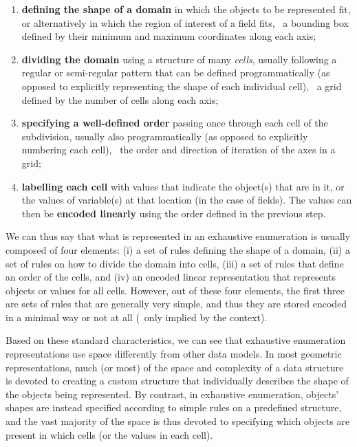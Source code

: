 \begin{enumerate}

\item \textbf{defining the shape of a domain} in which the objects to be represented fit, or alternatively in which the region of interest of a field fits, \eg\ a bounding box defined by their minimum and maximum coordinates along each axis;

\item \textbf{dividing the domain} using a structure of many \emph{cells}, usually following a regular or semi-regular pattern that can be defined programmatically (as opposed to explicitly representing the shape of each individual cell), \eg\ a grid defined by the number of cells along each axis;

\item \textbf{specifying a well-defined order} passing once through each cell of the subdivision, usually also programmatically (as opposed to explicitly numbering each cell), \eg\ the order and direction of iteration of the axes in a grid;

\item \textbf{labelling each cell} with values that indicate the object(s) that are in it, or the values of variable(s) at that location (in the case of fields). The values can then be \textbf{encoded linearly} using the order defined in the previous step.

\end{enumerate}

We can thus say that what is represented in an exhaustive enumeration is usually composed of four elements: (i) a set of rules defining the shape of a domain, (ii) a set of rules on how to divide the domain into cells, (iii) a set of rules that define an order of the cells, and (iv) an encoded linear representation that represents objects or values for all cells.
However, out of these four elements, the first three are sets of rules that are generally very simple, and thus they are stored encoded in a minimal way or not at all (\ie\ only implied by the context).

Based on these standard characteristics, we can see that exhaustive enumeration representations use space differently from other data models.
In most geometric representations, much (or most) of the space and complexity of a data structure is devoted to creating a custom structure that individually describes the shape of the objects being represented.
By contrast, in exhaustive enumeration, objects' shapes are instead specified according to simple rules on a predefined structure, and the vast majority of the space is thus devoted to specifying which objects are present in which cells (or the values in each cell).

